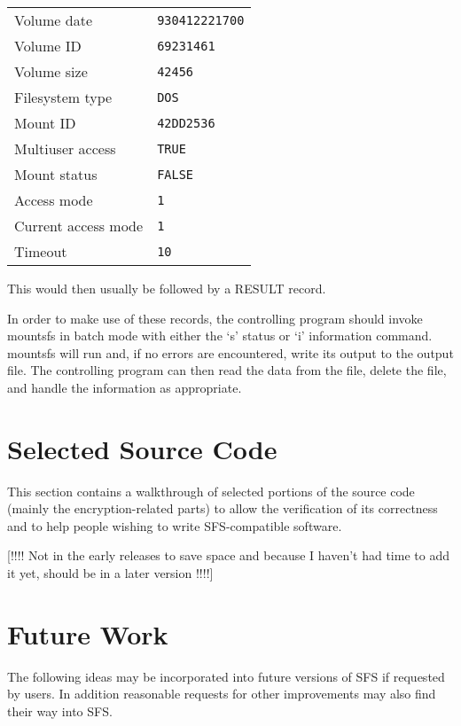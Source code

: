 \begin{center}
\begin{tabular}{|l|l|}
    Volume date          &   {\tt 930412221700}\\
    Volume ID            &   {\tt 69231461}\\
    Volume size          &   {\tt 42456}\\
    Filesystem type      &   {\tt DOS}\\
    Mount ID             &   {\tt 42DD2536}\\
    Multiuser access     &   {\tt TRUE}\\
    Mount status         &   {\tt FALSE}\\
    Access mode          &   {\tt 1}\\
    Current access mode  &   {\tt 1}\\
    Timeout              &   {\tt 10}\\
\hline
\end{tabular}
\end{center}

This would then usually be followed by a RESULT record.

In order to make use of these records, the controlling program should invoke
mount\-sfs in batch mode with either the `s' status or `i' information command.
mountsfs will run and, if no errors are encountered, write its output to the
output file.  The controlling program can then read the data from the file,
delete the file, and handle the information as appropriate.


\section{Selected Source Code}

This section contains a walkthrough of selected portions of the source code
(mainly the encryption-related parts) to allow the verification of its
correctness and to help people wishing to write SFS-compatible software.

[!!!! Not in the early releases to save space and because I haven't had
      time to add it yet, should be in a later version !!!!]


\section{Future Work}

The following ideas may be incorporated into future versions of SFS if
requested by users.  In addition reasonable requests for other improvements may
also find their way into SFS.

